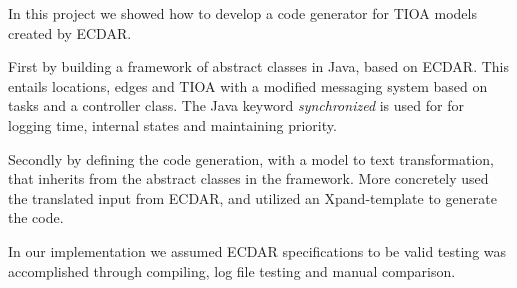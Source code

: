 In this project we showed how to develop a code generator for TIOA 
models created by ECDAR. 

First by building a framework of abstract classes in Java, based on 
ECDAR. This entails locations, edges and TIOA with a modified messaging 
system based on tasks and a controller class. The Java keyword 
\textit{synchronized} is used for for logging time, internal states and 
maintaining priority. 

Secondly by defining the code generation, with a model to text 
transformation, that inherits from the abstract classes in the 
framework. More concretely used the translated input from ECDAR, and 
utilized an Xpand-template to generate the code. 

In our implementation we assumed ECDAR specifications to be valid 
testing was accomplished through compiling, log file testing and manual 
comparison. 

